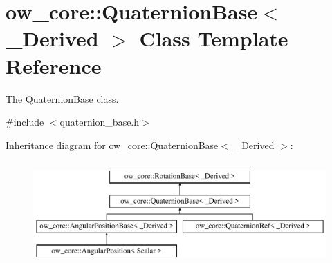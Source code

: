 \hypertarget{classow__core_1_1QuaternionBase}{}\section{ow\+\_\+core\+:\+:Quaternion\+Base$<$ \+\_\+\+Derived $>$ Class Template Reference}
\label{classow__core_1_1QuaternionBase}


The \hyperlink{classow__core_1_1QuaternionBase}{Quaternion\+Base} class.  




{\ttfamily \#include $<$quaternion\+\_\+base.\+h$>$}

Inheritance diagram for ow\+\_\+core\+:\+:Quaternion\+Base$<$ \+\_\+\+Derived $>$\+:\begin{figure}[H]
\begin{center}
\leavevmode
\includegraphics[height=4.000000cm]{d9/d92/classow__core_1_1QuaternionBase}
\end{center}
\end{figure}
